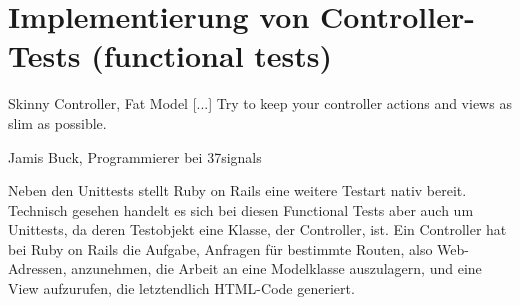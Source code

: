\section{Implementierung von Controller-Tests (functional tests)}
\epigraph{Skinny Controller, Fat Model [...] Try to keep your controller actions and views as slim as possible.}{Jamis Buck, Programmierer bei 37signals}


Neben den Unittests stellt Ruby on Rails eine weitere Testart nativ bereit. Technisch gesehen handelt es sich bei diesen Functional Tests aber auch um Unittests, da deren Testobjekt eine Klasse, der Controller, ist. 
Ein Controller hat bei Ruby on Rails die Aufgabe, Anfragen für bestimmte Routen, also Web-Adressen, anzunehmen, die Arbeit an eine Modelklasse auszulagern, und eine View aufzurufen, die letztendlich HTML-Code generiert.


